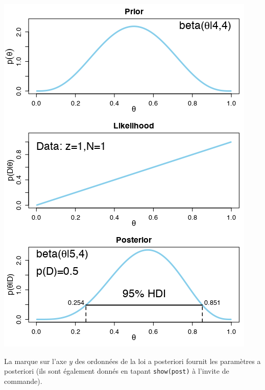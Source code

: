 \begin{Exemple}
\begin{enumerate}[label=(\alph*)]
\begin{center}
	\includegraphics[width=\linewidth]{Images/example51.png}
	\end{center}
	La marque sur l'axe $y$ des ordonnées de la loi a posteriori fournit les paramètres a posteriori (ils sont également donnés en tapant \small \texttt{show(post)} \normalsize à l'invite de commande).
	

\end{enumerate}
\end{Exemple}

